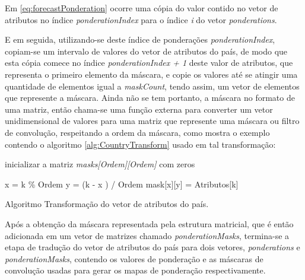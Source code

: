 Em \ref{eq:forecastPonderation} ocorre uma cópia do valor contido no vetor de atributos no índice \emph{ponderationIndex} para o índice \emph{i} do vetor \emph{ponderations}.

E em seguida, utilizando-se deste índice de ponderações \emph{ponderationIndex}, copiam-se um intervalo de valores do vetor de atributos do país, de modo que esta cópia comece no índice \emph{ponderationIndex + 1} deste valor de atributos, que representa o primeiro elemento da máscara, e copie os valores até se atingir uma quantidade de elementos igual a \emph{maskCount}, tendo assim, um vetor de elementos que represente a máscara. Ainda não se tem portanto, a máscara no formato de uma matriz, então chama-se uma função externa para converter um vetor unidimensional de valores para uma matriz que represente uma máscara ou filtro de convolução, respeitando a ordem da máscara, como mostra o exemplo contendo o algoritmo \ref{alg:CountryTransform} usado em tal transformação:

\vspace{10px}
\begin{algorithm}[h]
\SetAlgoLined
{}
inicializar a matriz \emph{masks[Ordem][Ordem]} com zeros\;

{
x = k \% Ordem\;
y = (k - x ) / Ordem\;
mask[x][y] = Atributos[k]\; 
}
\caption{ Algoritmo Transformação do vetor de atributos do país.}
\label{alg:CountryTransform}
\end{algorithm}

Após a obtenção da máscara representada pela estrutura matricial, que é então adicionada em um vetor de matrizes chamado \emph{ponderationMasks}, termina-se a etapa de tradução do vetor de atributos do país para dois vetores, \emph{ponderations} e \emph{ponderationMasks}, contendo os valores de ponderação e as máscaras de convolução usadas para gerar os mapas de ponderação respectivamente.

